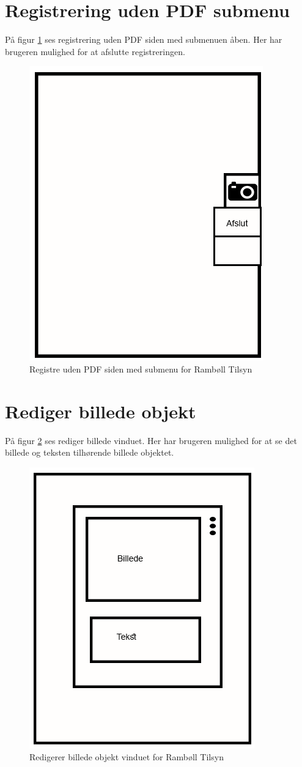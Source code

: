 \section{Registrering uden PDF submenu}\label{sec:RegUdenPDFSubMock}
På figur \ref{fig:RegUdenPDFSubMock} ses registrering uden PDF siden med submenuen åben. Her har brugeren mulighed for at afslutte registreringen.

\begin{figure}[H]
	\centering
	\includegraphics[width=0.4\linewidth]{MockUps/Mock/Ramboell-TilsynUden-sub}
	\caption{Registre uden PDF siden med submenu for Rambøll Tilsyn}
	\label{fig:RegUdenPDFSubMock}
\end{figure}

\clearpage

\section{Rediger billede objekt}\label{sec:RedigerBilledeMock}
På figur \ref{fig:RedigerBilledeMock} ses rediger billede vinduet. Her har brugeren mulighed for at se det billede og teksten tilhørende billede objektet.

\begin{figure}[H]
	\centering
	\includegraphics[width=0.4\linewidth]{MockUps/Mock/Ramboell-RedigerBilledeOpbjekt}
	\caption{Redigerer billede objekt vinduet for Rambøll Tilsyn}
	\label{fig:RedigerBilledeMock}
\end{figure}

